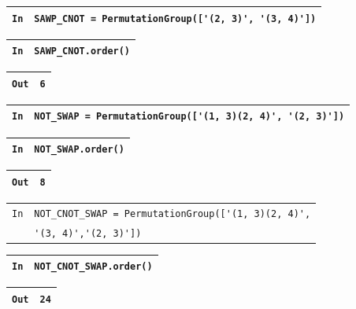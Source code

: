 \documentclass[titlepage]{article}
\begin{document}
    \begin{tabularx}{11.5cm}{|p{0.60cm}|X|}
        \hline
        \verb|In|
        & 
        \verb|SAWP_CNOT = PermutationGroup(['(2, 3)', '(3, 4)'])|
        \\
        \hline
    \end{tabularx}\newline
    \begin{tabularx}{11.5cm}{|p{0.60cm}|X|}
        \hline
        \verb|In|
        & 
        \verb|SAWP_CNOT.order()|
        \\
        \hline
    \end{tabularx}\newline
    \begin{tabularx}{11.5cm}{|p{0.60cm}|X|}
        \hline
        \verb|Out|
        & 
        \verb|6|
        \\
        \hline
    \end{tabularx}\newline

    \begin{tabularx}{11.5cm}{|p{0.60cm}|X|}
        \hline
        \verb|In|
        & 
        \verb|NOT_SWAP = PermutationGroup(['(1, 3)(2, 4)', '(2, 3)'])|
        \\
        \hline
    \end{tabularx}\newline
    \begin{tabularx}{11.5cm}{|p{0.60cm}|X|}
        \hline
        \verb|In|
        & 
        \verb|NOT_SWAP.order()|
        \\
        \hline
    \end{tabularx}\newline
    \begin{tabularx}{11.5cm}{|p{0.60cm}|X|}
        \hline
        \verb|Out|
        & 
        \verb|8|
        \\
        \hline
    \end{tabularx}\newline

    \begin{tabularx}{11.5cm}{|p{0.60cm}|X|}
        \hline
        \verb|In|
        & 
        \verb|NOT_CNOT_SWAP = PermutationGroup(['(1, 3)(2, 4)',|
        \\
        \verb||
        &
        \verb|'(3, 4)','(2, 3)'])|
        \\
        \hline
    \end{tabularx}\newline
    \begin{tabularx}{11.5cm}{|p{0.60cm}|X|}
        \hline
        \verb|In|
        & 
        \verb|NOT_CNOT_SWAP.order()|
        \\
        \hline
    \end{tabularx}\newline
    \begin{tabularx}{11.5cm}{|p{0.60cm}|X|}
        \hline
        \verb|Out|
        & 
        \verb|24|
        \\
        \hline
    \end{tabularx}\newline
\end{document}
